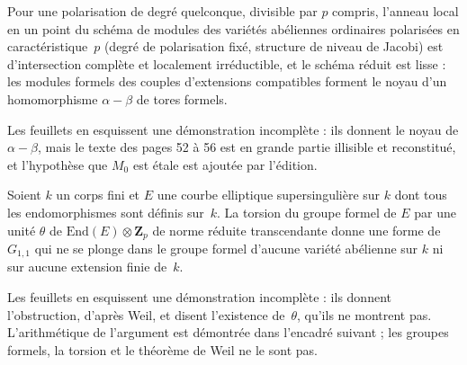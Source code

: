 \begin{encadre}
\begin{theoreme*}\nonverifie
Pour une polarisation de degré quelconque, divisible par $p$ compris, l'anneau local en un point du schéma de modules des variétés abéliennes ordinaires polarisées en caractéristique~$p$ (degré de polarisation fixé, structure de niveau de Jacobi) est d'intersection complète et localement irréductible, et le schéma réduit est lisse : les modules formels des couples d'extensions compatibles forment le noyau d'un homomorphisme $\alpha - \beta$ de tores formels.
\end{theoreme*}
\end{encadre}
{\small Les feuillets en esquissent une démonstration incomplète : ils donnent le noyau de $\alpha - \beta$, mais le texte des pages 52 à 56 est en grande partie illisible et reconstitué, et l'hypothèse que $M_0$ est étale est ajoutée par l'édition.\par}

\begin{encadre}
\begin{theoreme*}\nonverifie
Soient $k$ un corps fini et $E$ une courbe elliptique supersingulière sur $k$ dont tous les endomorphismes sont définis sur~$k$. La torsion du groupe formel de $E$ par une unité $\theta$ de $\mathrm{End}(E) \otimes \mathbf Z_p$ de norme réduite transcendante donne une forme de $G_{1,1}$ qui ne se plonge dans le groupe formel d'aucune variété abélienne sur $k$ ni sur aucune extension finie de~$k$.
\end{theoreme*}
\end{encadre}
{\small Les feuillets en esquissent une démonstration incomplète : ils donnent l'obstruction, d'après Weil, et disent  l'existence de~$\theta$, qu'ils ne montrent pas. L'arithmétique de l'argument est démontrée dans l'encadré suivant ; les groupes formels, la torsion et le théorème de Weil ne le sont pas.\par}

